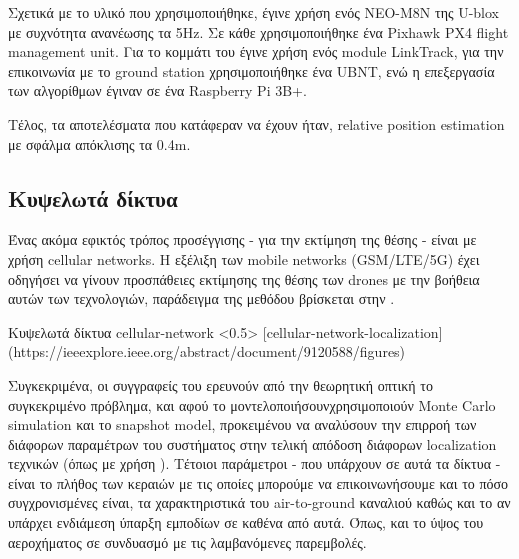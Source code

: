 Σχετικά με το υλικό που χρησιμοποιήθηκε, έγινε χρήση ενός NEO-M8N  της U-blox με συχνότητα ανανέωσης τα 5Hz.  
Σε κάθε  χρησιμοποιήθηκε ένα Pixhawk PX4 flight management unit. Για το κομμάτι του  έγινε χρήση
ενός module LinkTrack, για την επικοινωνία με το ground station χρησιμοποιήθηκε ένα UBNT, ενώ η επεξεργασία των 
αλγορίθμων έγιναν σε ένα Raspberry Pi 3B+. 

Τέλος, τα αποτελέσματα που κατάφεραν να έχουν ήταν,  relative position estimation με σφάλμα απόκλισης τα 0.4m. 

\subsection{Κυψελωτά δίκτυα}
Ένας ακόμα εφικτός τρόπος προσέγγισης - για την εκτίμηση της θέσης - είναι με χρήση
cellular networks. Η εξέλιξη των mobile networks (GSM/LTE/5G) έχει οδηγήσει να γίνουν προσπάθειες εκτίμησης
της θέσης των drones με την βοήθεια αυτών των τεχνολογιών, παράδειγμα της μεθόδου βρίσκεται στην . 

{Κυψελωτά δίκτυα}%
{cellular-network}%
<0.5>%
[cellular-network-localization]%
(https://ieeexplore.ieee.org/abstract/document/9120588/figures)

Συγκεκριμένα, οι συγγραφείς του \cite{cellular-network-localization} ερευνούν από την θεωρητική οπτική το συ\-γκε\-κρι\-μένο πρόβλημα, 
και αφού το μοντελοποιήσουν\udot χρησιμοποιούν Monte Carlo simulation και το snapshot model, προκειμένου να αναλύσουν την επιρροή 
των διάφορων παραμέτρων του συστήματος στην τελική απόδοση διάφορων localization τεχνικών (όπως με χρήση ). Τέτοιοι 
παράμετροι - που υπάρχουν σε αυτά τα δίκτυα - είναι το πλήθος των κεραιών με τις οποίες μπορούμε να επικοινωνήσουμε και το πόσο συγχρονισμένες 
είναι, τα χαρακτηριστικά του air-to-ground καναλιού καθώς και το αν υπάρχει ενδιάμεση ύπαρξη εμποδίων σε καθένα από αυτά. Όπως, και το 
ύψος του αεροχήματος σε συνδυασμό με τις λαμβανόμενες παρεμβολές.


